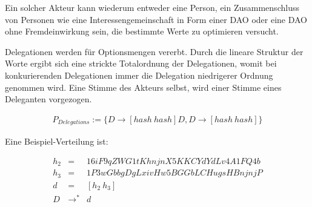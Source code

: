 \documentclass[a4paper,12pt]{report}
\begin{document}
Ein solcher Akteur kann wiederum entweder eine Person, ein Zusammenschluss von Personen wie eine Interessengemeinschaft in Form einer DAO oder eine DAO ohne Fremdeinwirkung sein, die bestimmte Werte zu optimieren versucht.

Delegationen werden für Optionsmengen vererbt. Durch die lineare Struktur der Worte ergibt sich eine strickte Totalordnung der Delegationen, womit bei konkurierenden Delegationen immer die Delegation niedrigerer Ordnung genommen wird. Eine Stimme des Akteurs selbst, wird einer Stimme eines Deleganten vorgezogen.

\begin{eqnarray}
P_{Delegations} := \{D\rightarrow [hash\ hash]D,D\rightarrow [hash\ hash]\} 
\end{eqnarray}

Eine Beispiel-Verteilung ist: 

\begin{eqnarray}
  h_2 &=& 16iF9qZWG1tKhnjnX5KKCYdYdLv4A1FQ4b\\
  h_3 &=& 1P3wGbbgDgLxivHw5BGGbLCHugsHBnjnjP\\
  d &=& [h_2\ h_3] \\
  D &\rightarrow^*& d
\end{eqnarray}


% 
% 
% 
\end{document}

